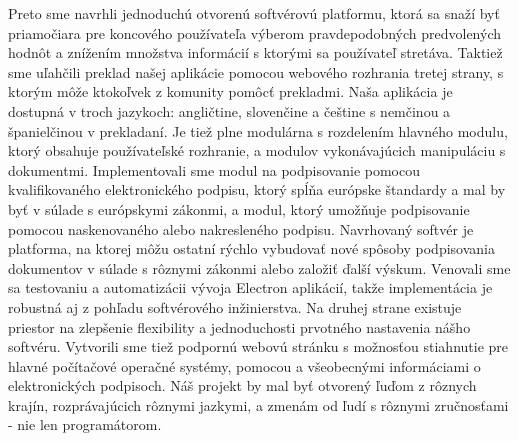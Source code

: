 \documentclass[thesismargins, english, thesislinespacing, onelinechapterstyle, upjsfrontpage]{rnthesis}
\begin{document}
Preto sme navrhli jednoduchú otvorenú softvérovú platformu, ktorá sa snaží byť priamočiara pre koncového používateľa výberom pravdepodobných predvolených hodnôt a znížením množstva informácií s ktorými sa používateľ stretáva.
Taktiež sme uľahčili preklad našej aplikácie pomocou webového rozhrania tretej strany, s ktorým môže ktokoľvek z komunity pomôcť prekladmi.
Naša aplikácia je dostupná v troch jazykoch: angličtine, slovenčine a češtine s nemčinou a španielčinou v prekladaní.
Je tiež plne modulárna s rozdelením hlavného modulu, ktorý obsahuje používateľské rozhranie, a modulov vykonávajúcich manipuláciu s dokumentmi.
Implementovali sme modul na podpisovanie pomocou kvalifikovaného elektronického podpisu, ktorý spĺňa európske štandardy a mal by byť v súlade s európskymi zákonmi, a modul, ktorý umožňuje podpisovanie pomocou naskenovaného alebo nakresleného podpisu.
Navrhovaný softvér je platforma, na ktorej môžu ostatní rýchlo vybudovať nové spôsoby podpisovania dokumentov v súlade s rôznymi zákonmi alebo založiť ďalší výskum.
Venovali sme sa testovaniu a automatizácii vývoja Electron aplikácií, takže implementácia je robustná aj z pohľadu softvérového inžinierstva.
Na druhej strane existuje priestor na zlepšenie flexibility a jednoduchosti prvotného nastavenia nášho softvéru.
Vytvorili sme tiež podpornú webovú stránku s možnosťou stiahnutie pre hlavné počítačové operačné systémy, pomocou a všeobecnými informáciami o elektronických podpisoch.
Náš projekt by mal byť otvorený ľuďom z rôznych krajín, rozprávajúcich rôznymi jazkymi, a zmenám od ľudí s rôznymi zručnosťami - nie len programátorom.
\end{document}
